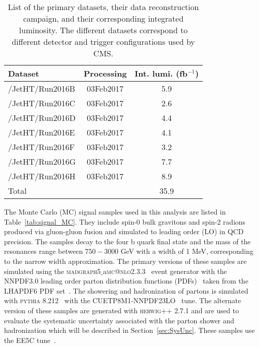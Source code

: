 {\begin{table}[htb]
\renewcommand{\arraystretch}{1.2}
  \begin{center}
    \begin{tabular}{l|c|c}
      \hline
      \hline
      Dataset & Processing & Int. lumi. (fb$^{-1}$) \\
      \hline
      /JetHT/Run2016B   & 03Feb2017 & 5.9  \\
      /JetHT/Run2016C   & 03Feb2017 & 2.6  \\
      /JetHT/Run2016D   & 03Feb2017 & 4.4  \\
      /JetHT/Run2016E   & 03Feb2017 & 4.1  \\
      /JetHT/Run2016F   & 03Feb2017 & 3.2  \\
      /JetHT/Run2016G   & 03Feb2017 & 7.7  \\
      /JetHT/Run2016H   & 03Feb2017 & 8.9 \\
      \hline
      Total & & 35.9 \\
      \hline
      \hline
    \end{tabular}
  \end{center}
 \caption{List of the primary datasets, their data reconstruction campaign, and their corresponding integrated luminosity. The different datasets correspond to different detector and trigger configurations used by CMS.\label{tab:data}}
\end{table}}

The Monte Carlo (MC) signal samples used in this analysis are listed in Table~\ref{tab:signal_MC}. They include spin-0 bulk gravitons and spin-2 radions produced via gluon-gluon fusion and simulated to leading order (LO) in QCD precision. The samples decay to the four b quark final state and the mass of the resonances range between $750-3000$ GeV with a width of 1 MeV, corresponding to the narrow width approximation. The primary versions of these samples are simulated using the \textsc{madgraph5}$\_$a\textsc{mc}\textsc{@nlo}2.3.3~\cite{MADGRAPH} event generator with the NNPDF3.0 leading order parton distribution functions (PDFs)~\cite{PDFs} taken from the LHAPDF6 PDF set~\cite{PDF2, PDF3, PDF4, PDF5}. The showering and hadronization of partons is simulated with \textsc{pythia} 8.212~\cite{Pythia} with the CUETP8M1-NNPDF23LO~\cite{CUET} tune. The alternate version of these samples are generated with \textsc{herwig++} 2.7.1 and are used to evaluate the systematic uncertainty associated with the parton shower and hadronization which will be described in Section~\ref{sec:SysUnc}. These samples use the EE5C tune~\cite{EE5C}.

